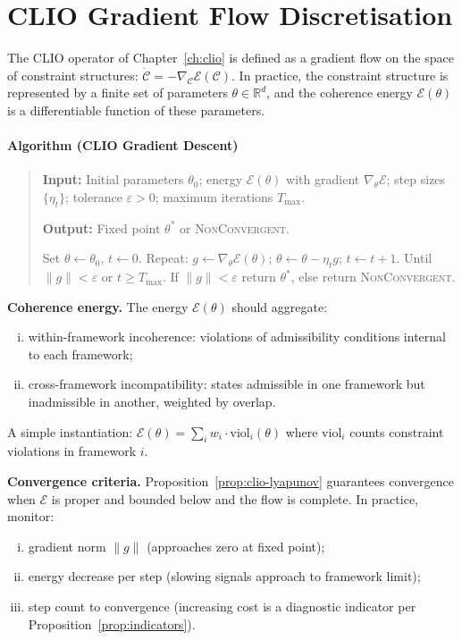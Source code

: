 \documentclass[11pt,openany]{book}
\begin{document}
\section{CLIO Gradient Flow Discretisation}
\label{sec:clio-impl}

The CLIO operator of Chapter~\ref{ch:clio} is defined as a
gradient flow on the space of constraint structures:
$\dot{\mathcal{C}} = -\nabla_{\mathcal{C}}
\mathcal{E}(\mathcal{C})$.  In practice, the constraint
structure is represented by a finite set of parameters
$\theta \in \mathbb{R}^d$, and the coherence energy
$\mathcal{E}(\theta)$ is a differentiable function of these
parameters.


\paragraph{Algorithm (CLIO Gradient Descent)}\label{alg:clio}

\begin{quote}
\textbf{Input:} Initial parameters $\theta_0$; energy $\mathcal{E}(\theta)$ with gradient $\nabla_\theta\mathcal{E}$; step sizes $\{\eta_t\}$; tolerance $\varepsilon > 0$; maximum iterations $T_{\max}$.

\textbf{Output:} Fixed point $\theta^*$ or \textsc{NonConvergent}.

Set $\theta \gets \theta_0$, $t \gets 0$. Repeat: $g \gets \nabla_\theta\mathcal{E}(\theta)$; $\theta \gets \theta - \eta_t g$; $t \gets t+1$. Until $\|g\| < \varepsilon$ or $t \geq T_{\max}$. If $\|g\| < \varepsilon$ return $\theta^*$, else return \textsc{NonConvergent}.
\end{quote}


\textbf{Coherence energy.} The energy $\mathcal{E}(\theta)$
should aggregate:
\begin{enumerate}[(i)]
  \item within-framework incoherence: violations of
    admissibility conditions internal to each framework;
  \item cross-framework incompatibility: states admissible
    in one framework but inadmissible in another, weighted
    by overlap.
\end{enumerate}
A simple instantiation: $\mathcal{E}(\theta) =
\sum_i w_i \cdot \mathrm{viol}_i(\theta)$ where
$\mathrm{viol}_i$ counts constraint violations in framework
$i$.

\textbf{Convergence criteria.}
Proposition~\ref{prop:clio-lyapunov} guarantees convergence
when $\mathcal{E}$ is proper and bounded below and the flow
is complete.  In practice, monitor:
\begin{enumerate}[(i)]
  \item gradient norm $\|g\|$ (approaches zero at
    fixed point);
  \item energy decrease per step (slowing signals
    approach to framework limit);
  \item step count to convergence (increasing cost is a
    diagnostic indicator per
    Proposition~\ref{prop:indicators}).
\end{enumerate}
\end{document}

